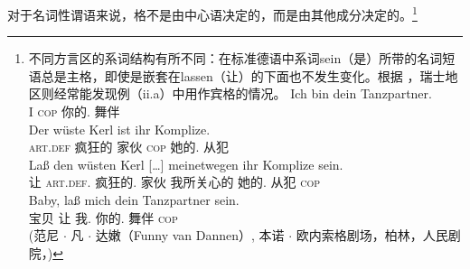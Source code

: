 对于名词性谓语\label{page-Kasuskongruenz}来说，格不是由中心语决定的，而是由其他成分决定的。\footnote{%
不同方言区的系词结构有所不同：在标准德语中系词sein（是）所带的名词短语总是主格，即使是嵌套在lassen（让）的下面也不发生变化。根据 \citet*[{\S}\,1259]{Duden95-Authors}，瑞士地区则经常能发现例（ii.a）中用作宾格的情况。
\eal
\ex 
\gll Ich bin dein Tanzpartner.\\
     I \textsc{cop} 你的.\nom{} 舞伴\\
\ex 
\gll Der wüste Kerl ist ihr Komplize.\\
     \textsc{art}.\textsc{def} 疯狂的  家伙  \textsc{cop}  她的.\nom{} 从犯\\
\ex 
\gll Laß den wüsten Kerl [\ldots] meinetwegen ihr Komplize sein.\\
     让 \textsc{art}.\textsc{def}.\acc{} 疯狂的.\acc{} 家伙 {} 我所关心的 她的.\nom{} 从犯 \textsc{cop}\\
 \citep*[{\S}\,6925]{Duden66-Authors}%
\ex 
\gll Baby, laß mich dein Tanzpartner sein.\\
     宝贝 让 我.\acc{} 你的.\nom{} 舞伴 \textsc{cop}\\
  (范尼 $\cdot$ 凡 $\cdot$ 达嫩（Funny van Dannen）, 本诺 $\cdot$ 欧内索格剧场，柏林，人民剧院，)
\zl

        \eal
        \zllast}
        
